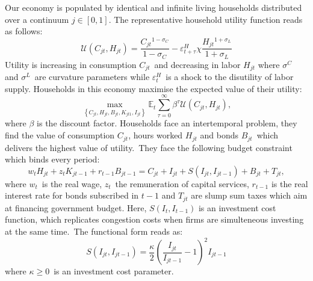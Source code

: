 \documentclass[a4paper,12pt]{article}%
\begin{document}
Our economy is populated by identical and infinite living households
distributed over a continuum $j\in\left[  0,1\right]  $. The representative
household utility function reads as follows:
\[
\mathcal{U}\left(  C_{jt},H_{jt}\right)  =\frac{C_{jt}{}^{1-\sigma_{C}}%
}{1-\sigma_{C}}-\varepsilon_{t+\tau}^{H}\chi\frac{H_{jt}{}^{1+\sigma_{L}}%
}{1+\sigma_{L}}%
\]
Utility is increasing in consumption $C_{jt}$\ and decreasing in labor
$H_{jt}$ where $\sigma^{C}$ and $\sigma^{L}$\ are curvature parameters while
$\varepsilon_{t}^{H}$\ is a shock to the disutility of labor supply.
Households in this economy maximise the expected value of their utility:\
\begin{equation}
\text{$\max_{\left\{  C_{jt},H_{jt},B_{jt},K_{jt1},I_{jt}\right\}  }%
\mathbb{E}_{t}%
{\displaystyle\sum\limits_{\tau=0}^{\infty}}
\beta^{\tau}\mathcal{U}\left(  C_{jt},H_{jt}\right)  ,$} \label{eq hh welfare}%
\end{equation}
where $\beta$ is the discount factor. Households face an intertemporal
problem, they find the value of consumption $C_{jt}$, hours worked $H_{jt}$
and bonds $B_{jt}$\ which delivers the highest value of utility.\ They face
the following budget constraint which binds every period:%
\begin{equation}
w_{t}H_{jt}+z_{t}K_{jt-1}+r_{t-1}B_{jt-1}=C_{jt}+I_{jt}+S\left(
I_{jt},I_{jt-1}\right)  +B_{jt}+T_{jt}, \label{eq hh balance constraint}%
\end{equation}
where $w_{t}$\ is the real wage, $z_{t}$\ the remuneration of capital
services, $r_{t-1}$ is the real interest rate for bonds subscribed in $t-1$
and $T_{jt}$ are slump sum taxes which aim at financing government budget.
Here, $S\left(  I_{t},I_{t-1}\right)  $ is an investment cost function, which
replicates congestion costs when firms are simulteneous investing at the same
time.\ The functional form reads as:%
\begin{equation}
S\left(  I_{jt},I_{jt-1}\right)  =\frac{\kappa}{2}\left(  \frac{I_{jt}%
}{I_{jt-1}}-1\right)  ^{2}I_{jt-1}%
\end{equation}
where $\kappa\geq0$\ is an investment cost parameter.
\end{document}
